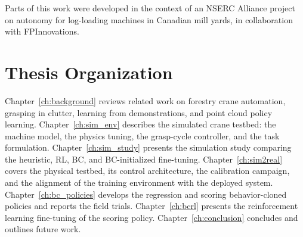 Parts of this work were developed in the context of an NSERC Alliance project
on autonomy for log-loading machines in Canadian mill yards, in collaboration
with FPInnovations.

\section{Thesis Organization}

Chapter~\ref{ch:background} reviews related work on forestry crane automation,
grasping in clutter, learning from demonstrations, and point cloud policy
learning. Chapter~\ref{ch:sim_env} describes the simulated crane testbed: the
machine model, the physics tuning, the grasp-cycle controller, and the task
formulation. Chapter~\ref{ch:sim_study} presents the simulation study comparing
the heuristic, RL, BC, and BC-initialized fine-tuning.
Chapter~\ref{ch:sim2real} covers the physical testbed, its control
architecture, the calibration campaign, and the alignment of the training
environment with the deployed system. Chapter~\ref{ch:bc_policies} develops
the regression and scoring behavior-cloned policies and reports the field
trials. Chapter~\ref{ch:bcrl} presents the reinforcement learning fine-tuning
of the scoring policy. Chapter~\ref{ch:conclusion} concludes and outlines
future work.
